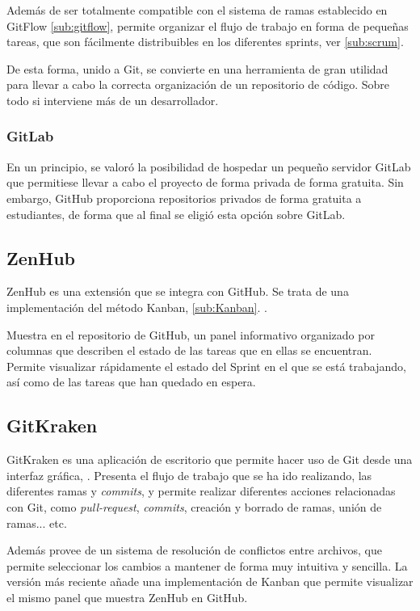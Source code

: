 Además de ser totalmente compatible con el sistema de ramas establecido en GitFlow \ref{sub:gitflow}, permite organizar el flujo de trabajo en forma de pequeñas tareas, que son fácilmente distribuibles en los diferentes sprints, ver \ref{sub:scrum}. 

De esta forma, unido a Git, se convierte en una herramienta de gran utilidad para llevar a cabo la correcta organización de un repositorio de código. Sobre todo si interviene más de un desarrollador. 

\subsubsection{GitLab}
En un principio, se valoró la posibilidad de hospedar un pequeño servidor GitLab que permitiese llevar a cabo el proyecto de forma privada de forma gratuita. Sin embargo, GitHub proporciona repositorios privados de forma gratuita a estudiantes, de forma que al final se eligió esta opción sobre GitLab.

\subsection{ZenHub}

ZenHub es una extensión que se integra con GitHub. Se trata de una implementación del método Kanban, \ref{sub:Kanban}. \citep{wiki:ZenHub}.

Muestra en el repositorio de GitHub, un panel informativo organizado por columnas que describen el estado de las tareas que en ellas se encuentran. 
Permite visualizar rápidamente el estado del Sprint en el que se está trabajando, así como de las tareas que han quedado en espera.

\subsection{GitKraken}

GitKraken es una aplicación de escritorio que permite hacer uso de Git desde una interfaz gráfica, \citep{wiki:GitKraken}. Presenta el flujo de trabajo que se ha ido realizando, las diferentes ramas y \emph{commits}, y permite realizar diferentes acciones relacionadas con Git, como \emph{pull-request}, \emph{commits}, creación y borrado de ramas, unión de ramas... etc.

Además provee de un sistema de resolución de conflictos entre archivos, que permite seleccionar los cambios a mantener de forma muy intuitiva y sencilla. 
La versión más reciente añade una implementación de Kanban que permite visualizar el mismo panel que muestra ZenHub en GitHub.

